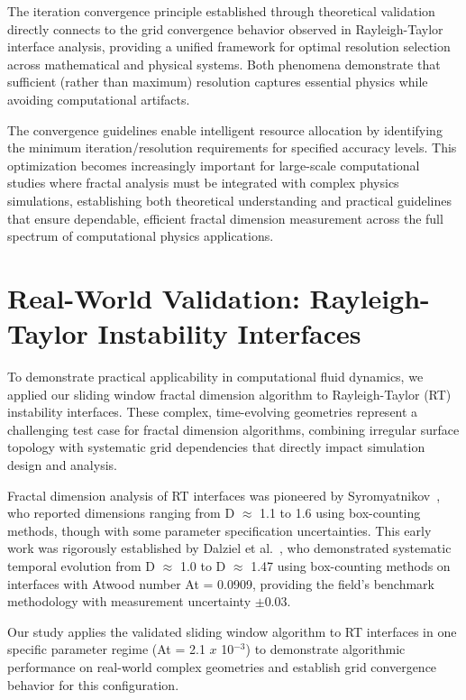 \documentclass[preprint,12pt]{elsarticle}
\def\times{x}%
\begin{document}
The iteration convergence principle established through theoretical validation directly connects to the grid convergence behavior observed in Rayleigh-Taylor interface analysis, providing a unified framework for optimal resolution selection across mathematical and physical systems. Both phenomena demonstrate that sufficient (rather than maximum) resolution captures essential physics while avoiding computational artifacts.

The convergence guidelines enable intelligent resource allocation by identifying the minimum iteration/resolution requirements for specified accuracy levels. This optimization becomes increasingly important for large-scale computational studies where fractal analysis must be integrated with complex physics simulations, establishing both theoretical understanding and practical guidelines that ensure dependable, efficient fractal dimension measurement across the full spectrum of computational physics applications.


\section{Real-World Validation: Rayleigh-Taylor Instability Interfaces}
\label{sec:rt_validation}

To demonstrate practical applicability in computational fluid dynamics, we applied our sliding window fractal dimension algorithm to Rayleigh-Taylor (RT) instability interfaces. These complex, time-evolving geometries represent a challenging test case for fractal dimension algorithms, combining irregular surface topology with systematic grid dependencies that directly impact simulation design and analysis.

Fractal dimension analysis of RT interfaces was pioneered by Syromyatnikov~\cite{syromyatnikov1993}, who reported dimensions ranging from D $\approx$ 1.1 to 1.6 using box-counting methods, though with some parameter specification uncertainties. This early work was rigorously established by Dalziel et al.~\cite{dalziel1999}, who demonstrated systematic temporal evolution from D $\approx$ 1.0 to D $\approx$ 1.47 using box-counting methods on interfaces with Atwood number At = 0.0909, providing the field's benchmark methodology with measurement uncertainty $\pm$0.03.

Our study applies the validated sliding window algorithm to RT interfaces in one specific parameter regime (At = 2.1 $\times$ 10$^{-3}$) to demonstrate algorithmic performance on real-world complex geometries and establish grid convergence behavior for this configuration.
\end{document}
